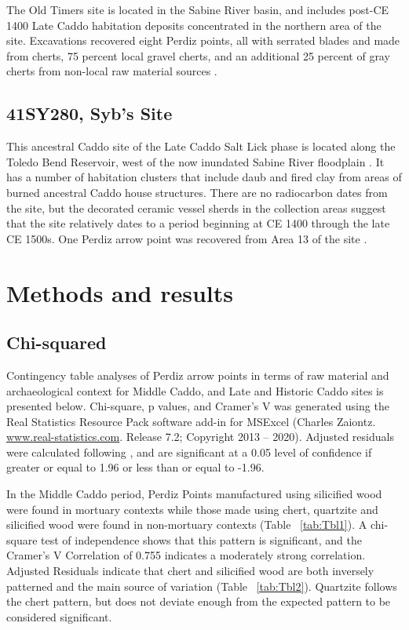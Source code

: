 \documentclass[review]{elsarticle}
\begin{document}
The Old Timers site is located in the Sabine River basin, and includes post-CE 1400 Late Caddo habitation deposits concentrated in the northern area of the site. Excavations recovered eight Perdiz points, all with serrated blades and made from cherts, 75 percent local gravel cherts, and an additional 25 percent of gray cherts from non-local raw material sources \citep[77]{RN8966}.

\subsection*{41SY280, Syb’s Site} 

This ancestral Caddo site of the Late Caddo Salt Lick phase is located along the Toledo Bend Reservoir, west of the now inundated Sabine River floodplain \citep[Figure 55]{RN8966}. It has a number of habitation clusters that include daub and fired clay from areas of burned ancestral Caddo house structures. There are no radiocarbon dates from the site, but the decorated ceramic vessel sherds in the collection areas suggest that the site relatively dates to a period beginning at CE 1400 through the late CE 1500s. One Perdiz arrow point was recovered from Area 13 of the site \citep[Table 33]{RN8966}.

\section*{Methods and results}

\subsection*{Chi-squared}

Contingency table analyses of Perdiz arrow points in terms of raw material and archaeological context for Middle Caddo, and Late and Historic Caddo sites is presented below. Chi-square, p values, and Cramer’s V was generated using the Real Statistics Resource Pack software add-in for MSExcel (Charles Zaiontz. \href{www.real-statistics.com}{www.real-statistics.com}. Release 7.2; Copyright 2013 – 2020). Adjusted residuals were calculated following \citep{RN8987}, and are significant at a 0.05 level of confidence if greater or equal to 1.96 or less than or equal to -1.96. 

In the Middle Caddo period, Perdiz Points manufactured using silicified wood were found in mortuary contexts while those made using chert, quartzite and silicified wood were found in non-mortuary contexts (Table ~\ref{tab:Tbl1}). A chi-square test of independence shows that this pattern is significant, and the Cramer’s V Correlation of 0.755 indicates a moderately strong correlation. Adjusted Residuals indicate that chert and silicified wood are both inversely patterned and the main source of variation (Table ~\ref{tab:Tbl2}). Quartzite follows the chert pattern, but does not deviate enough from the expected pattern to be considered significant.
\end{document}
